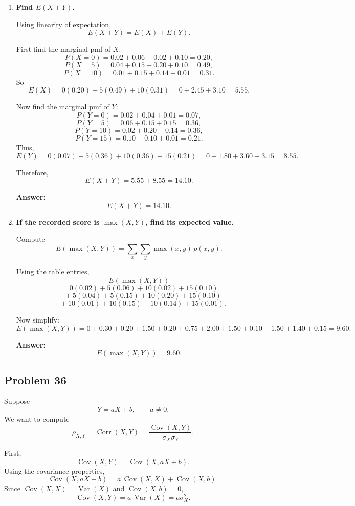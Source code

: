 \begin{enumerate}
    \item[(a)] \textbf{Find $E(X+Y)$.}

    Using linearity of expectation,
    \[
    E(X+Y)=E(X)+E(Y).
    \]

    First find the marginal pmf of $X$:
    \[
    P(X=0)=0.02+0.06+0.02+0.10=0.20,
    \]
    \[
    P(X=5)=0.04+0.15+0.20+0.10=0.49,
    \]
    \[
    P(X=10)=0.01+0.15+0.14+0.01=0.31.
    \]
    So
    \[
    E(X)=0(0.20)+5(0.49)+10(0.31)=0+2.45+3.10=5.55.
    \]

    Now find the marginal pmf of $Y$:
    \[
    P(Y=0)=0.02+0.04+0.01=0.07,
    \]
    \[
    P(Y=5)=0.06+0.15+0.15=0.36,
    \]
    \[
    P(Y=10)=0.02+0.20+0.14=0.36,
    \]
    \[
    P(Y=15)=0.10+0.10+0.01=0.21.
    \]
    Thus,
    \[
    E(Y)=0(0.07)+5(0.36)+10(0.36)+15(0.21)
    =0+1.80+3.60+3.15=8.55.
    \]

    Therefore,
    \[
    E(X+Y)=5.55+8.55=14.10.
    \]

    \textbf{Answer:}
    \[
    E(X+Y)=14.10.
    \]

    \item[(b)] \textbf{If the recorded score is $\max(X,Y)$, find its expected value.}

    Compute
    \[
    E(\max(X,Y))=\sum_x \sum_y \max(x,y)\,p(x,y).
    \]

    Using the table entries,
    \[
    E(\max(X,Y))
    \]
    \[
    =0(0.02)+5(0.06)+10(0.02)+15(0.10)
    \]
    \[
    \quad +5(0.04)+5(0.15)+10(0.20)+15(0.10)
    \]
    \[
    \quad +10(0.01)+10(0.15)+10(0.14)+15(0.01).
    \]

    Now simplify:
    \[
    E(\max(X,Y))
    =0+0.30+0.20+1.50+0.20+0.75+2.00+1.50+0.10+1.50+1.40+0.15
    =9.60.
    \]

    \textbf{Answer:}
    \[
    E(\max(X,Y))=9.60.
    \]
\end{enumerate}

\subsection*{Problem 36}

Suppose
\[
Y=aX+b, \qquad a\ne 0.
\]
We want to compute
\[
\rho_{X,Y}=\operatorname{Corr}(X,Y)=\frac{\operatorname{Cov}(X,Y)}{\sigma_X\sigma_Y}.
\]

First,
\[
\operatorname{Cov}(X,Y)=\operatorname{Cov}(X,aX+b).
\]
Using the covariance properties,
\[
\operatorname{Cov}(X,aX+b)=a\,\operatorname{Cov}(X,X)+\operatorname{Cov}(X,b).
\]
Since $\operatorname{Cov}(X,X)=\operatorname{Var}(X)$ and $\operatorname{Cov}(X,b)=0$,
\[
\operatorname{Cov}(X,Y)=a\,\operatorname{Var}(X)=a\sigma_X^2.
\]

